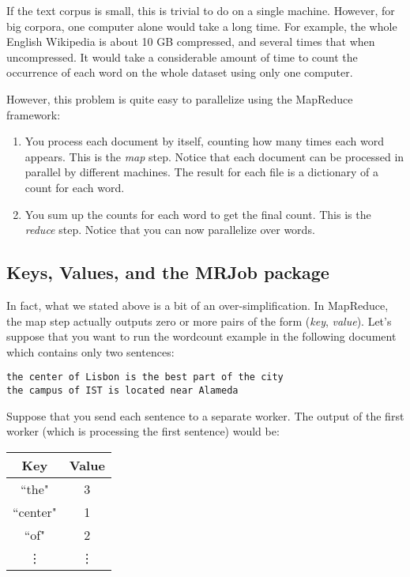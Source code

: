 If the text corpus is small, this is trivial to do on a single machine. However, for big corpora, one computer alone would take a long time. For example, the whole English Wikipedia is about 10 GB compressed, and several times that when uncompressed. It would take a considerable amount of time to count the occurrence of each word on the whole dataset using only one computer.

However, this problem is quite easy to parallelize using the MapReduce framework:

\begin{enumerate}
\item You process each document by itself, counting how many times each word
appears. This is the \emph{map} step. Notice that each document can be
processed in parallel by different machines. The result for each file is a
dictionary of a count for each word.
\item You sum up the counts for each word to get the final count. This is the
\emph{reduce} step. Notice that you can now parallelize over words.
\end{enumerate}

\subsection{Keys, Values, and the MRJob package}
In fact, what we stated above is a bit of an over-simplification. In MapReduce, the map step actually outputs zero or more pairs of the form (\emph{key}, \emph{value}). Let's suppose that you want to run the wordcount example in the following document which contains only two sentences:

\begin{verbatim}
the center of Lisbon is the best part of the city
the campus of IST is located near Alameda
\end{verbatim}

Suppose that you send each sentence to a separate worker. The output of the first worker (which is processing the first sentence) would be:

\begin{center}
\begin{tabular}{|c|c|}
\hline
Key & Value \\
\hline\hline
``the" & 3 \\
``center" & 1 \\
``of" & 2\\
\vdots & \vdots \\
\end{tabular}
\end{center}

